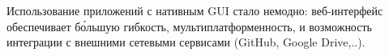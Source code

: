 \label{wx}\secdown

Использование приложений с нативным GUI стало немодно: веб-интер\-фейс
обеспечивает б\'{о}льшую гибкость, мультиплатформенность, и возможность
интеграции с внешними сетевыми сервисами (GitHub, Google Drive,..).

\clearpage
{}

\secup